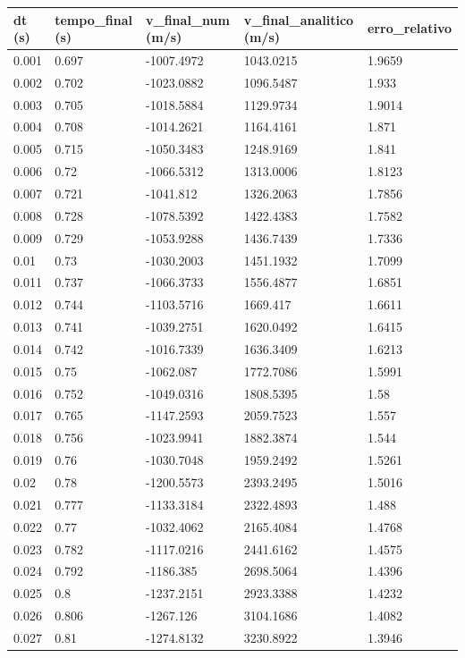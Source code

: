 \begin{tabular}{lllll}
\toprule
dt (s) & tempo\_final (s) & v\_final\_num (m/s) & v\_final\_analitico (m/s) & erro\_relativo \\
\midrule
0.001 & 0.697 & -1007.4972 & 1043.0215 & 1.9659 \\
0.002 & 0.702 & -1023.0882 & 1096.5487 & 1.933 \\
0.003 & 0.705 & -1018.5884 & 1129.9734 & 1.9014 \\
0.004 & 0.708 & -1014.2621 & 1164.4161 & 1.871 \\
0.005 & 0.715 & -1050.3483 & 1248.9169 & 1.841 \\
0.006 & 0.72 & -1066.5312 & 1313.0006 & 1.8123 \\
0.007 & 0.721 & -1041.812 & 1326.2063 & 1.7856 \\
0.008 & 0.728 & -1078.5392 & 1422.4383 & 1.7582 \\
0.009 & 0.729 & -1053.9288 & 1436.7439 & 1.7336 \\
0.01 & 0.73 & -1030.2003 & 1451.1932 & 1.7099 \\
0.011 & 0.737 & -1066.3733 & 1556.4877 & 1.6851 \\
0.012 & 0.744 & -1103.5716 & 1669.417 & 1.6611 \\
0.013 & 0.741 & -1039.2751 & 1620.0492 & 1.6415 \\
0.014 & 0.742 & -1016.7339 & 1636.3409 & 1.6213 \\
0.015 & 0.75 & -1062.087 & 1772.7086 & 1.5991 \\
0.016 & 0.752 & -1049.0316 & 1808.5395 & 1.58 \\
0.017 & 0.765 & -1147.2593 & 2059.7523 & 1.557 \\
0.018 & 0.756 & -1023.9941 & 1882.3874 & 1.544 \\
0.019 & 0.76 & -1030.7048 & 1959.2492 & 1.5261 \\
0.02 & 0.78 & -1200.5573 & 2393.2495 & 1.5016 \\
0.021 & 0.777 & -1133.3184 & 2322.4893 & 1.488 \\
0.022 & 0.77 & -1032.4062 & 2165.4084 & 1.4768 \\
0.023 & 0.782 & -1117.0216 & 2441.6162 & 1.4575 \\
0.024 & 0.792 & -1186.385 & 2698.5064 & 1.4396 \\
0.025 & 0.8 & -1237.2151 & 2923.3388 & 1.4232 \\
0.026 & 0.806 & -1267.126 & 3104.1686 & 1.4082 \\
0.027 & 0.81 & -1274.8132 & 3230.8922 & 1.3946 \\

\end{tabular}

